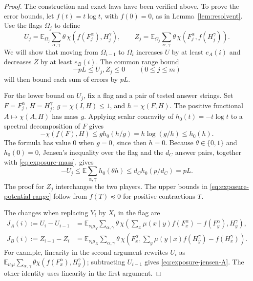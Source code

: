 \begin{proof}
The construction and exact laws have been verified above. To prove the
error bounds, let $f(t)=t\log t$, with $f(0)=0$, as in
Lemma~\ref{lem:resolvent}. Use the flags $\Omega_j$ to define
\[
 U_j=\mathbb E_{\Omega_j}\sum_{\alpha,\gamma}
      \theta\,\chi(f(F_j^\alpha),H_j^\gamma),\qquad
 Z_j=\mathbb E_{\Omega_j}\sum_{\alpha,\gamma}
      \theta\,\chi(F_j^\alpha,f(H_j^\gamma)).
\]
We will show that moving from $\Omega_{i-1}$ to $\Omega_i$ increases
$U$ by at least $e_A(i)$ and decreases $Z$ by at least $e_B(i)$.
The common range bound
\begin{equation}\label{eq:exposure-potential-range}
 -pL\le U_j,Z_j\le0\qquad(0\le j\le m)
\end{equation}
will then bound each sum of errors by $pL$.

For the lower bound on $U_j$, fix a flag and a pair of tested answer
strings. Set $F=F_j^\alpha$, $H=H_j^\gamma$,
$g=\chi(I,H)\le1$, and $h=\chi(F,H)$. The positive functional
$A\mapsto\chi(A,H)$ has mass $g$. Applying scalar concavity of
$h_0(t)=-t\log t$ to a spectral decomposition of $F$ gives
\[
 -\chi(f(F),H)\le g h_0(h/g)
       =h\log(g/h)\le h_0(h).
\]
The formula has value $0$ when $g=0$, since then $h=0$. Because
$\theta\in\{0,1\}$ and $h_0(0)=0$, Jensen's inequality over the flag
and the $d_C$ answer pairs, together with
\eqref{eq:exposure-mass}, gives
\[
 -U_j\le\mathbb E\sum_{\alpha,\gamma}h_0(\theta h)
      \le d_C h_0(p/d_C)=pL.
\]
The proof for $Z_j$ interchanges the two players. The upper bounds in
\eqref{eq:exposure-potential-range} follow from $f(T)\preceq0$ for
positive contractions $T$.

The changes when replacing $Y_i$ by $X_i$ in the flag are
\begin{align}
 J_A(i):=U_i-U_{i-1}
 &=\mathbb E_{\nu_i\mu_Y}\sum_{\alpha,\gamma}\theta\,
   \chi\left(\sum_x\mu(x\mid y)f(F_x^\alpha)
                      -f(F_y^\alpha),H_y^\gamma\right),
       \label{eq:exposure-jensen-A}\\
 J_B(i):=Z_{i-1}-Z_i
 &=\mathbb E_{\nu_i\mu_X}\sum_{\alpha,\gamma}\theta\,
   \chi\left(F_x^\alpha,
       \sum_y\mu(y\mid x)f(H_y^\gamma)-f(H_x^\gamma)\right).
       \label{eq:exposure-jensen-B}
\end{align}
For example, linearity in the second argument rewrites $U_i$ as
$\mathbb E_{\nu_i\mu}\sum_{\alpha,\gamma}
\theta\chi(f(F_x^\alpha),H_y^\gamma)$; subtracting $U_{i-1}$ gives
\eqref{eq:exposure-jensen-A}. The other identity uses linearity in the
first argument.


\end{proof}
